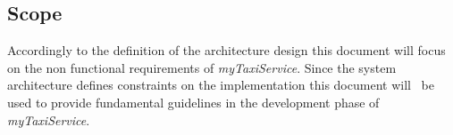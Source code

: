 \documentclass[a4paper,11pt]{report} %
\newcommand{\mts}{\mbox{\normalfont\itshape myTaxiService}}
\begin{document}
	\subsection{Scope} Accordingly to the definition of the architecture design this document will focus on the non functional requirements of \mts{}. 
	Since the system architecture  defines constraints on the implementation this document will  be  used to provide fundamental guidelines in the development phase of \mts{}.
	
\end{document}
